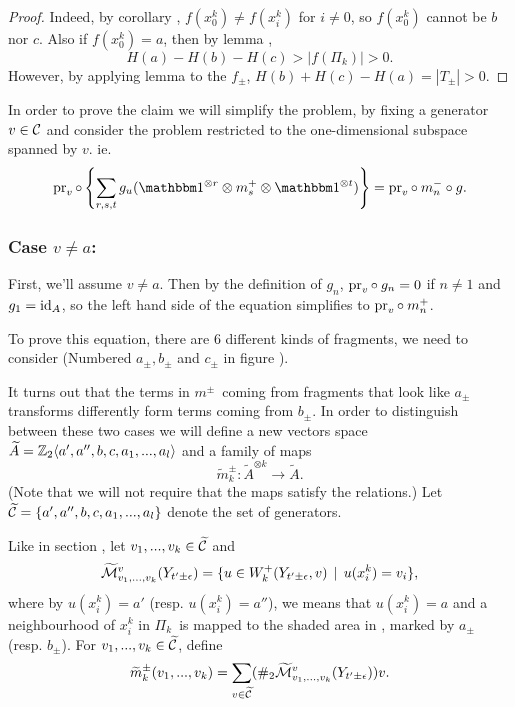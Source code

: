 \begin{proof}
Indeed, by corollary , $f(x^k_0) \ne
f(x^k_i)$ for $i\ne0$, so $f(x^k_0)$ cannot be $b$ nor $c$. 
Also if $f(x^k_0) = a$, then by lemma , 
\[ H(a) - H(b) - H(c) > |f(\Pi_k)| > 0. \]
However, by applying lemma  to the $f_\pm$, 
$H(b) + H(c) - H(a) = |T_\pm| > 0$.
\end{proof}

In order to prove the claim  we will simplify
the problem, by fixing a generator $v \in \mathcal{C}$ and consider the problem
restricted to the one-dimensional subspace spanned by $v$. ie. 
\begin{equation}
\label{eq:move_iii_a_inf_rel_pr}
\pr_v \circ \left\{ \sum_{r,s,t} g_u(\I^{\otimes r} \otimes m^+_s \otimes \I^{\otimes t})
\right\} = \pr_v \circ\:  m^-_n \circ g . 
%
\end{equation}



\subsubsection{Case $v \ne a$:}
First, we'll assume $v \ne a$. Then by the definition of $g_n$, 
$\operatorname{pr}_v \circ \: g_n = 0$ if $n\ne 1$ and $g_1 = \operatorname{id}_A$, so the left hand side of the equation
simplifies to $\operatorname{pr}_v \circ\: m^+_n$. 

To prove this equation, there are 6 different kinds of fragments, we
need to consider (Numbered $a_\pm, b_\pm$ and $c_\pm$ in figure
 ).


\newcommand{\tA}{\tilde{A}}
\newcommand{\tC}{\tilde{\Cc}}
\newcommand{\tm}{\tilde{m}}

It turns out that the terms in $m^\pm$ coming from fragments that look like
$a_\pm$ transforms differently form terms coming from $b_\pm$. In order to
distinguish between these two cases we will define a new vectors space
$\tA = \Z_2\<{a',a'',b,c,a_1,...,a_l}$ and a family of maps
\[ \tm^\pm_k : \tA^{\otimes k} \to \tA.  \]
(Note that we will not require that the maps satisfy the \Ainf relations.)
Let $\tC = \{ a',a'',b,c,a_1,...,a_l\}$ denote the set of generators.

Like in section , let $v_1,...,v_k \in \tC$ and 
\[ \widetilde{\mathcal{M}}^v_{v_1,...,v_k}(Y_{t'\pm\epsilon}) = \{ u \in W^+_k (Y_{t'\pm\epsilon},v) \:\:|\:\: u(x^k_i) = v_i \}, \]
where by $u(x^k_i) = a'$ (resp. $u(x^k_i) = a''$), we means that $u(x^k_i) = a$
and a neighbourhood of $x^k_i$ in $\Pi_k$ is mapped to the shaded area in
, marked by $a_\pm$ (resp. $b_\pm$). For $v_1,...,v_k \in \tC$, define 
\[ \tm^\pm_k(v_1,...,v_k) = \sum_{v\in\tC} (\#_2
\tilde{\M}^v_{v_1,...,v_k}(Y_{t'\pm\epsilon})) v. \]

